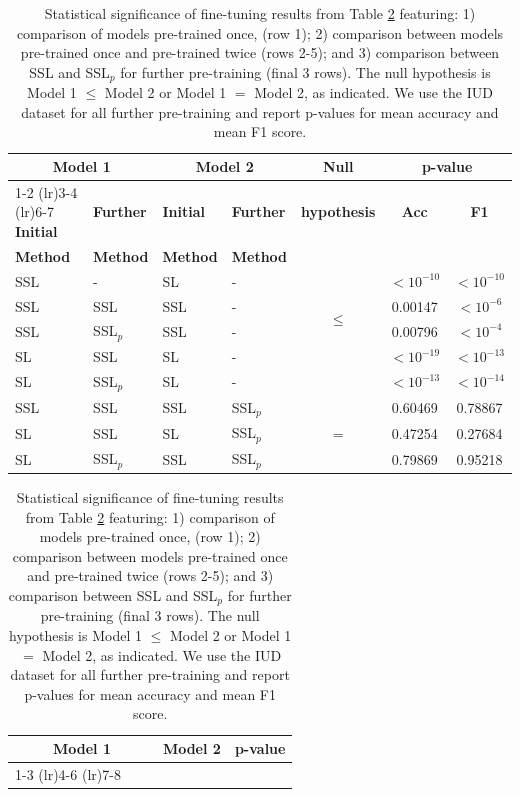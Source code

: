 \documentclass[a4paper,fleqn]{cas-dc}
\begin{document}
\begin{table}[httb]
\centering
\begin{tabular}{llllccc}
\toprule
\multicolumn{2}{c}{\textbf{Model 1}} & \multicolumn{2}{c}{\textbf{Model 2}} & \textbf{Null} & \multicolumn{2}{c}{\textbf{p-value}} \\
\cmidrule(lr){1-2} \cmidrule(lr){3-4} \cmidrule(lr){6-7}
\textbf{Initial} & \textbf{Further} & \textbf{Initial} & \textbf{Further} & \textbf{hypothesis} & \textbf{Acc} & \textbf{F1} \\
\textbf{Method} & \textbf{Method} & \textbf{Method} & \textbf{Method} & & & \\
\midrule
SSL & - & SL & - & \multirow{4}{*}{$\leq$} & $<10^{-10}$ & $<10^{-10}$ \\
SSL & SSL & SSL & - &  & 0.00147 & $<10^{-6}$ \\
SSL & SSL$_p$ & SSL & - &  & 0.00796 & $<10^{-4}$ \\
SL & SSL & SL & - &  & $<10^{-19}$ & $<10^{-13}$ \\
SL & SSL$_p$ & SL & - &  & $<10^{-13}$ & $<10^{-14}$ \\
\midrule
SSL & SSL & SSL & SSL$_p$ & \multirow{3}{*}{=} & 0.60469 & 0.78867 \\
SL & SSL & SL & SSL$_p$ &  & 0.47254 & 0.27684 \\
SL & SSL$_p$ & SSL & SSL$_p$ &  & 0.79869 & 0.95218 \\
\bottomrule
\end{tabular}
\caption{Statistical significance of fine-tuning results from Table \ref{tab:isic_semi_sup_sig} featuring: 1) comparison of models pre-trained once, (row 1); 2) comparison between models pre-trained once and pre-trained twice (rows 2-5); and 3) comparison between SSL and SSL$_p$ for further pre-training (final 3 rows). The null hypothesis is Model 1 $\leq$ Model 2 or Model 1 $=$ Model 2, as indicated. We use the IUD dataset for all further pre-training  and report p-values for mean accuracy and mean F1 score.}
\label{tab:isic_semi_sup_sig}
\vspace{5em}
\centering
\small
\begin{tabular}{llllllcc}
\toprule
\multicolumn{3}{c}{\textbf{Model 1}} & \multicolumn{3}{c}{\textbf{Model 2}} & \multicolumn{2}{c}{\textbf{p-value}} \\
\cmidrule(lr){1-3} \cmidrule(lr){4-6} \cmidrule(lr){7-8}

\end{tabular}
\end{table}
\end{document}
